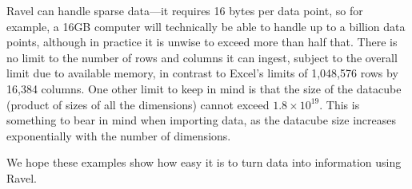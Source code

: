 Ravel can handle sparse data---it requires 16 bytes per data point, so
for example, a 16GB computer will technically be able to handle up to a billion
data points, although in practice it is unwise to exceed more than
half that. There is no limit to the number of rows and columns it can
ingest, subject to the overall limit due to available memory, in
contrast to Excel's limits of 1,048,576 rows by 16,384 columns. One
other limit to keep in mind is that the size of the datacube (product
of sizes of all the dimensions) cannot exceed $1.8\times
10^{19}$. This is something to bear in mind when importing data, as
the datacube size increases exponentially with the number of
dimensions.

We hope these examples show how easy it is to turn data into information
using Ravel.
